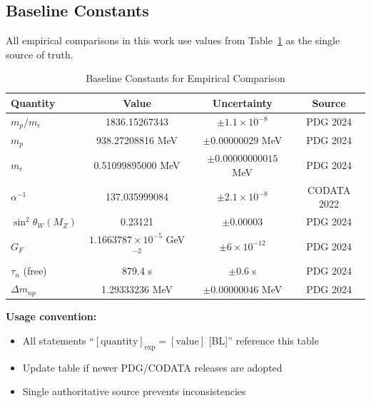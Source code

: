 
\subsection*{Baseline Constants}
\label{sec:baseline_constants}

All empirical comparisons in this work use values from Table~\ref{tab:baseline_constants} 
as the single source of truth.

\begin{table}[h]
\caption{Baseline Constants for Empirical Comparison}
\label{tab:baseline_constants}
\centering
\begin{tabular}{lccc}
\hline
\textbf{Quantity} & \textbf{Value} & \textbf{Uncertainty} & \textbf{Source} \\
\hline
$m_p/m_e$ & 1836.15267343 & $\pm 1.1 \times 10^{-8}$ & PDG 2024 \\
$m_p$ & 938.27208816 MeV & $\pm 0.00000029$ MeV & PDG 2024 \\
$m_e$ & 0.51099895000 MeV & $\pm 0.00000000015$ MeV & PDG 2024 \\
$\alpha^{-1}$ & 137.035999084 & $\pm 2.1 \times 10^{-8}$ & CODATA 2022 \\
$\sin^2\theta_W(M_Z)$ & 0.23121 & $\pm 0.00003$ & PDG 2024 \\
$G_F$ & $1.1663787 \times 10^{-5}$ GeV$^{-2}$ & $\pm 6 \times 10^{-12}$ & PDG 2024 \\
$\tau_n$ (free) & 879.4 s & $\pm 0.6$ s & PDG 2024 \\
$\Delta m_{np}$ & 1.29333236 MeV & $\pm 0.00000046$ MeV & PDG 2024 \\
\hline
\end{tabular}
\end{table}

\textbf{Usage convention:}
\begin{itemize}
\item All statements ``$[\text{quantity}]_{\text{exp}} = [\text{value}]$ [BL]'' reference this table
\item Update table if newer PDG/CODATA releases are adopted
\item Single authoritative source prevents inconsistencies
\end{itemize}


